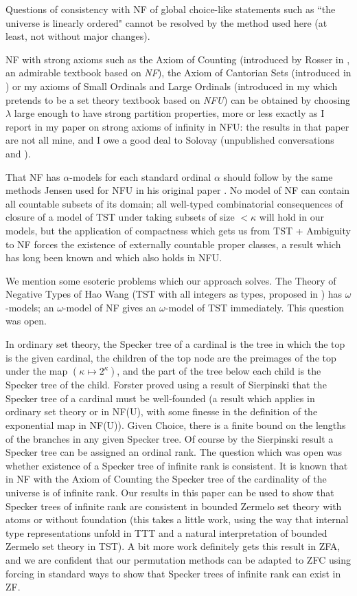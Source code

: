 \documentclass[112pt]{article}
\begin{document}
Questions of consistency with NF of global choice-like statements such as ``the universe is linearly ordered"  cannot be resolved by the method used here (at least, not without major changes).

NF with strong axioms such as the Axiom of Counting (introduced by Rosser in \cite{rosser}, an admirable textbook based on {\em NF\/}), the Axiom of Cantorian Sets (introduced in \cite{henson})  or my axioms of Small Ordinals and Large Ordinals (introduced in  my \cite{mybook} which pretends to be a set theory textbook based on {\em NFU\/}) can be obtained by choosing $\lambda$ large enough to have strong partition properties, more or less exactly as I report in my paper \cite{strongaxioms} on strong axioms of infinity in NFU:  the results in that paper are not all mine, and I owe a good deal to Solovay (unpublished conversations and \cite{nfub}).

That NF has $\alpha$-models for each standard ordinal $\alpha$ should follow by the same methods Jensen used for NFU in his original paper \cite{nfu}.   No model of NF can contain all countable subsets of its domain;  all well-typed combinatorial consequences
of closure of a model of TST under taking subsets of size $<\kappa$ will hold in our models, but the application of compactness which gets us from TST + Ambiguity to NF forces the existence of externally countable proper classes, a result which has long been known and which also holds in NFU.

We mention some esoteric problems which our approach solves.  The Theory of Negative Types of Hao Wang (TST with all integers as types, proposed in \cite{tnt})  has $\omega$-models;  an $\omega$-model of NF gives an $\omega$-model of TST immediately.  This question was open.

In ordinary set theory, the Specker tree of a cardinal is the tree in which the top is the given cardinal, the children of the top node  are the preimages of the top under the map $(\kappa \mapsto 2^{\kappa})$, and the part of the tree
below each child is the Specker tree of the child.  Forster proved using a result of Sierpinski that the Specker tree of a cardinal must be well-founded (a result which applies in ordinary set theory or in NF(U), with some finesse in the definition of the exponential map in NF(U)).  Given Choice, there is a finite bound on the lengths of the branches in any given Specker tree.  Of course by the Sierpinski result a Specker tree can be assigned an ordinal rank.  The question which was open
was whether existence of a Specker tree of infinite rank is consistent.  It is known that in NF with the Axiom of Counting the Specker tree of the cardinality of the universe is of infinite rank.  Our results in this paper can be used to show that Specker trees of infinite rank are consistent in bounded Zermelo set theory with atoms or without foundation (this takes a little work, using the way that internal type representations unfold in TTT and a natural interpretation of bounded Zermelo set theory in TST).  A bit more work definitely gets this result in ZFA, and we are confident that our permutation methods can be adapted to ZFC using forcing in standard ways to show that Specker trees of infinite rank can exist in ZF.
\end{document}
